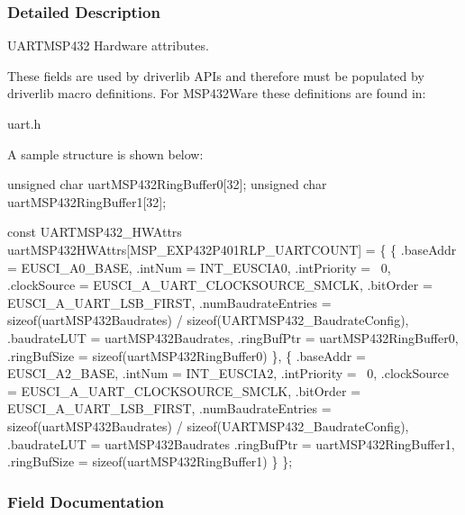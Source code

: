 \subsubsection{Detailed Description}
U\+A\+R\+T\+M\+S\+P432 Hardware attributes. 

These fields are used by driverlib A\+P\+Is and therefore must be populated by driverlib macro definitions. For M\+S\+P432\+Ware these definitions are found in\+:
\begin{DoxyItemize}
\item uart.\+h
\end{DoxyItemize}

A sample structure is shown below\+: 
\begin{DoxyCode}
\textcolor{keywordtype}{unsigned} \textcolor{keywordtype}{char} uartMSP432RingBuffer0[32];
\textcolor{keywordtype}{unsigned} \textcolor{keywordtype}{char} uartMSP432RingBuffer1[32];

\textcolor{keyword}{const} UARTMSP432_HWAttrs uartMSP432HWAttrs[MSP\_EXP432P401RLP\_UARTCOUNT] = \{
    \{
        .baseAddr = EUSCI\_A0\_BASE,
        .intNum = INT\_EUSCIA0,
        .intPriority = ~0,
        .clockSource = EUSCI\_A\_UART\_CLOCKSOURCE\_SMCLK,
        .bitOrder = EUSCI\_A\_UART\_LSB\_FIRST,
        .numBaudrateEntries = \textcolor{keyword}{sizeof}(uartMSP432Baudrates) /
                              \textcolor{keyword}{sizeof}(UARTMSP432_BaudrateConfig),
        .baudrateLUT = uartMSP432Baudrates,
        .ringBufPtr  = uartMSP432RingBuffer0,
        .ringBufSize = \textcolor{keyword}{sizeof}(uartMSP432RingBuffer0)
    \},
    \{
        .baseAddr = EUSCI\_A2\_BASE,
        .intNum = INT\_EUSCIA2,
        .intPriority = ~0,
        .clockSource = EUSCI\_A\_UART\_CLOCKSOURCE\_SMCLK,
        .bitOrder = EUSCI\_A\_UART\_LSB\_FIRST,
        .numBaudrateEntries = \textcolor{keyword}{sizeof}(uartMSP432Baudrates) /
                              \textcolor{keyword}{sizeof}(UARTMSP432_BaudrateConfig),
        .baudrateLUT = uartMSP432Baudrates
        .ringBufPtr  = uartMSP432RingBuffer1,
        .ringBufSize = \textcolor{keyword}{sizeof}(uartMSP432RingBuffer1)
    \}
\};
\end{DoxyCode}
 

\subsubsection{Field Documentation}
